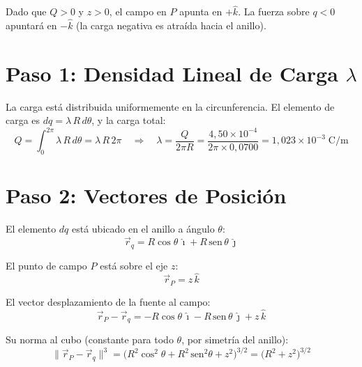 \documentclass[12pt,letterpaper]{article}
\begin{document}
Dado que $Q > 0$ y $z > 0$, el campo en $P$ apunta en $+\hat{k}$. La fuerza sobre $q < 0$ apuntará en $-\hat{k}$ (la carga negativa es atra\'ida hacia el anillo).

\section*{Paso 1: Densidad Lineal de Carga $\lambda$}

La carga est\'a distribuida uniformemente en la circunferencia. El elemento de carga es $dq = \lambda\,R\,d\theta$, y la carga total:
\begin{equation*}
    Q = \int_0^{2\pi} \lambda\,R\,d\theta = \lambda\,R\,2\pi
    \quad\Rightarrow\quad
    \lambda = \frac{Q}{2\pi R}
    = \frac{4{,}50\times10^{-4}}{2\pi\times0{,}0700}
    = 1{,}023\times10^{-3}\;\text{C/m}
\end{equation*}

\section*{Paso 2: Vectores de Posici\'on}

El elemento $dq$ est\'a ubicado en el anillo a \'angulo $\theta$:
\begin{equation*}
    \vec{r}_{q} = R\cos\theta\,\hat{\imath} + R\,\text{sen}\,\theta\,\hat{\jmath}
\end{equation*}

El punto de campo $P$ est\'a sobre el eje $z$:
\begin{equation*}
    \vec{r}_{P} = z\,\hat{k}
\end{equation*}

El vector desplazamiento de la fuente al campo:
\begin{equation*}
    \vec{r}_{P} - \vec{r}_{q}
    = -R\cos\theta\,\hat{\imath} - R\,\text{sen}\,\theta\,\hat{\jmath} + z\,\hat{k}
\end{equation*}

Su norma al cubo (constante para todo $\theta$, por simetr\'ia del anillo):
\begin{equation*}
    \|\vec{r}_{P} - \vec{r}_{q}\|^3
    = \bigl(R^2\cos^2\theta + R^2\,\text{sen}^2\theta + z^2\bigr)^{3/2}
    = \bigl(R^2 + z^2\bigr)^{3/2}
\end{equation*}
\end{document}
